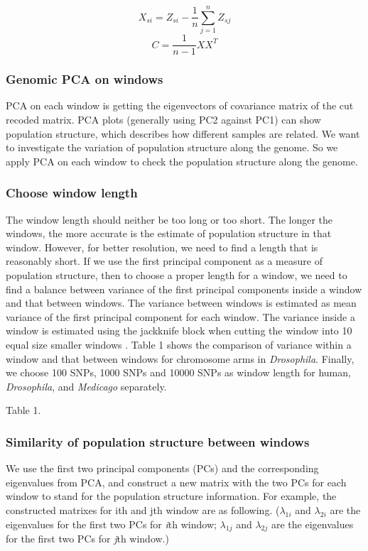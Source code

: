 \documentclass[11pt, oneside]{article}   	%
\begin{document}
\begin{equation}
X_{si}=Z_{si}-\frac{1}{n}\sum_{j=1}^{n}Z_{sj} 
\end{equation}
\begin{equation}
C=\frac{1}{n-1}XX^{T}
\end{equation}

\subsubsection{Genomic PCA on windows}
PCA on each window is getting the eigenvectors of covariance matrix of the cut recoded matrix. PCA plots (generally using PC2 against PC1) can show population structure, which describes how different samples are related. We want to investigate the variation of population structure along the genome. So we apply PCA on each window to check the population structure along the genome.
\subsubsection{Choose window length}
The window length should neither be too long or too short. The longer the windows, the more accurate is the estimate of population structure in that window. However, for better resolution, we need to find a length that is reasonably short. If we use the first principal component as a measure of population structure, then to choose a proper length for a
window, we need to find a balance between variance of the first principal components inside a window and that between windows. The variance between windows is estimated as mean variance of the first principal component for each window. The variance inside a window is estimated using the jackknife block when cutting the window into 10 equal size smaller windows \cite{key9}. Table 1 shows the comparison of variance within a window and that between windows for chromosome arms in \textit{Drosophila}. Finally, we choose 100 SNPs, 1000 SNPs and 10000 SNPs as window length for human, \textit{Drosophila}, and \textit{Medicago} separately.

Table 1.

\subsubsection{Similarity of population structure between windows}
We use the first two principal components (PCs) and the corresponding eigenvalues from PCA, and construct a new matrix with the two PCs for each window to stand for the population structure information. For example, the constructed matrixes for ith and jth window are as following. ($\lambda _{1i}$ and $\lambda _{2i}$ are the eigenvalues for the first two PCs for \textit{i}th window; $\lambda _{1j}$ and $\lambda _{2j}$ are the eigenvalues for the first two PCs for \textit{j}th window.)
\end{document}
